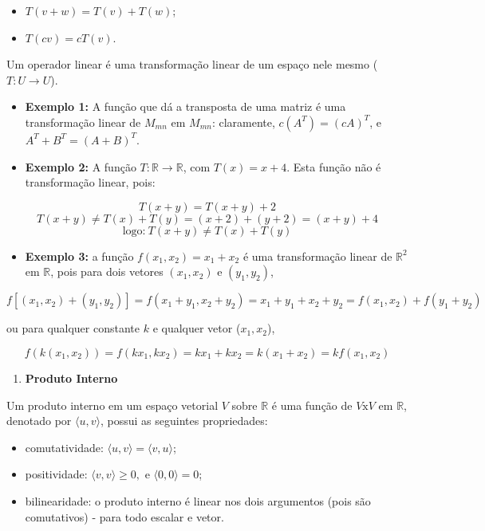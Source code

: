 \documentclass[
  openany]{book}
\providecommand{\tightlist}{%
  \setlength{\itemsep}{0pt}\setlength{\parskip}{0pt}}
\begin{document}
\begin{itemize}
\tightlist
\item
  \(T(v+w)=T(v)+T(w)\);
\item
  \(T(cv)=cT(v)\).
\end{itemize}

Um operador linear é uma transformação linear de um espaço nele mesmo (\(T:U\rightarrow U\)).

\begin{itemize}
\item
  \textbf{Exemplo 1:} A função que dá a transposta de uma matriz é uma transformação linear de \(M_{mn}\) em \(M_{mn}\): claramente, \(c(A^T)=(cA)^T\), e \(A^T+B^T=(A+B)^T\).
\item
  \textbf{Exemplo 2:} A função \(T:\mathbb{R}\rightarrow \mathbb{R}\), com \(T(x)=x+4\). Esta função não é transformação linear, pois:
\end{itemize}

\[T(x+y)=T(x+y)+2\]
\[T(x+y)\neq T(x)+T(y)=(x+2)+(y+2)=(x+y)+4\]
\[\mbox{logo:} \ T(x+y)\neq T(x)+T(y)\]

\begin{itemize}
\tightlist
\item
  \textbf{Exemplo 3:} a função \(f(x_1,x_2)=x_1+x_2\) é uma transformação linear de \(\mathbb{R}^2\) em \(\mathbb{R}\), pois para dois vetores \((x_1,x_2)\) e \((y_1,y_2)\),
\end{itemize}

\[f[(x_1,x_2)+(y_1,y_2)]=f(x_1+y_1,x_2+y_2)=x_1+y_1+x_2+y_2=f(x_1,x_2)+f(y_1+y_2)\]

ou para qualquer constante \(k\) e qualquer vetor (\(x_1,x_2\)),

\[f(k(x_1,x_2))=f(kx_1,kx_2)=kx_1+kx_2=k(x_1+x_2)=kf(x_1,x_2)\]

\begin{enumerate}
\def\labelenumi{\arabic{enumi}.}
\setcounter{enumi}{2}
\tightlist
\item
  \textbf{Produto Interno}
\end{enumerate}

Um produto interno em um espaço vetorial \(V\) sobre \(\mathbb{R}\) é uma função de \(V \mbox{x} V\) em \(\mathbb{R}\), denotado por \(\langle u,v \rangle\), possui as seguintes propriedades:

\begin{itemize}
\tightlist
\item
  comutatividade: \(\langle u,v \rangle=\langle v,u \rangle\);
\item
  positividade: \(\langle v,v \rangle \geq 0,\) e \(\langle 0,0 \rangle =0\);
\item
  bilinearidade: o produto interno é linear nos dois argumentos (pois são comutativos) - para todo escalar e vetor.
\end{itemize}
\end{document}

